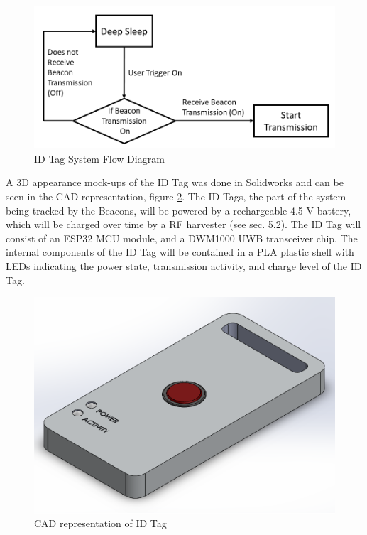 \bigskip
\begin{figure}[H]
\centering
    \includegraphics[width=\linewidth]{./images/id_flow.png}
    \caption{ID Tag System Flow Diagram}
    \label{id_flow}
\end{figure}

\pagebreak
A 3D appearance mock-ups of the ID Tag was done in Solidworks and can be seen in the CAD representation, figure \ref{ID_Tag}. The ID Tags, the part of the system being tracked by the Beacons, will be powered by a rechargeable 4.5 V battery, which will be charged over time by a RF harvester (see sec. 5.2). The ID Tag will consist of an ESP32 MCU module, and a DWM1000 UWB transceiver chip. The internal components of the ID Tag will be contained in a \Gls{PLA} plastic shell with LEDs indicating the power state, transmission activity, and charge level of the ID Tag. 

\bigskip
\begin{figure}[H]
\centering
    \includegraphics[width=\linewidth]{./images/ID_Tag.png}
    \caption{CAD representation of ID Tag}
    \label{ID_Tag}
\end{figure}



